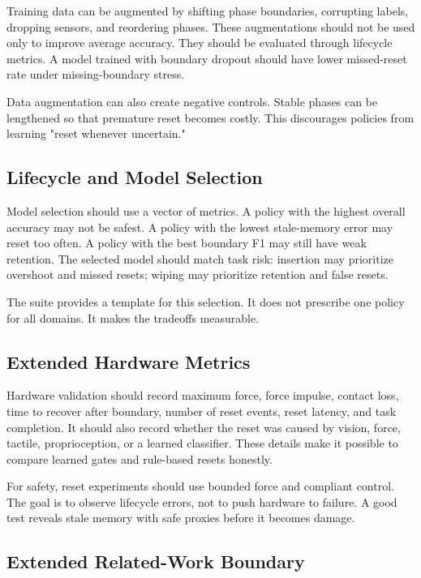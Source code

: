 \documentclass{article}
\begin{document}
Training data can be augmented by shifting phase boundaries, corrupting labels,
dropping sensors, and reordering phases. These augmentations should not be used
only to improve average accuracy. They should be evaluated through lifecycle
metrics. A model trained with boundary dropout should have lower missed-reset
rate under missing-boundary stress.

Data augmentation can also create negative controls. Stable phases can be
lengthened so that premature reset becomes costly. This discourages policies
from learning "reset whenever uncertain."

\subsection{Lifecycle and Model Selection}

Model selection should use a vector of metrics. A policy with the highest
overall accuracy may not be safest. A policy with the lowest stale-memory error
may reset too often. A policy with the best boundary F1 may still have weak
retention. The selected model should match task risk: insertion may prioritize
overshoot and missed resets; wiping may prioritize retention and false resets.

The suite provides a template for this selection. It does not prescribe one
policy for all domains. It makes the tradeoffs measurable.

\subsection{Extended Hardware Metrics}

Hardware validation should record maximum force, force impulse, contact loss,
time to recover after boundary, number of reset events, reset latency, and task
completion. It should also record whether the reset was caused by vision,
force, tactile, proprioception, or a learned classifier. These details make it
possible to compare learned gates and rule-based resets honestly.

For safety, reset experiments should use bounded force and compliant control.
The goal is to observe lifecycle errors, not to push hardware to failure. A
good test reveals stale memory with safe proxies before it becomes damage.

\subsection{Extended Related-Work Boundary}
\end{document}
